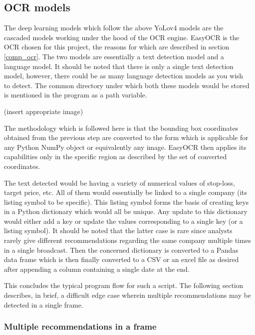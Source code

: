 \subsection{OCR models}

The deep learning models which follow the above YoLov4 models are the cascaded models working under the hood of the OCR engine. EasyOCR is the OCR chosen for this project, the reasons for which are described in section \ref{comp_ocr}. The two models are essentially a text detection model and a language model. It should be noted that there is only a single text detection model, however, there could be as many language detection models as you wish to detect. The common directory under which both these models would be stored is mentioned in the program as a path variable.

(insert appropriate image)

The methodology which is followed here is that the bounding box coordinates obtained from the previous step are converted to the form {} which is applicable for any Python NumPy object or equivalently any image. EasyOCR then applies its capabilities only in the specific region as described by the set of converted coordinates. \par

The text detected would be having a variety of numerical values of stop-loss, target price, etc. All of them would essentially be linked to a single company (its listing symbol to be specific). This listing symbol forms the basis of creating keys in a Python dictionary which would all be unique. Any update to this dictionary would either add a key or update the values corresponding to a single key (or a listing symbol). It should be noted that the latter case is rare since analysts rarely give different recommendations regarding the same company multiple times in a single broadcast. Then the concerned dictionary is converted to a Pandas data frame which is then finally converted to a CSV or an excel file as desired after appending a column containing a single date at the end. \par

This concludes the typical program flow for such a script. The following section describes, in brief, a difficult edge case wherein multiple recommendations may be detected in a single frame.

\subsubsection{Multiple recommendations in a frame}

